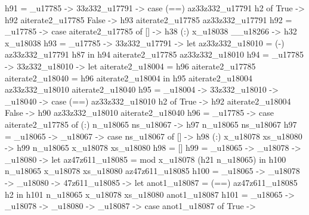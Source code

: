          h91 = _u17785 -> \az33z332_u17791 -> case (==) az33z332_u17791 h2 of
                                                          True -> h92 aiterate2_u17785
                                                          False -> h93 aiterate2_u17785 az33z332_u17791
         h92 = _u17785 -> case aiterate2_u17785 of
                                      [] -> h38
                                      (:) x_u18038 __u18266 -> h32 x_u18038
         h93 = _u17785 -> \az33z332_u17791 -> let
                                                          az33z332_u18010 = (-) az33z332_u17791 h87
                                                        in h94 aiterate2_u17785 az33z332_u18010
         h94 = _u17785 -> \az33z332_u18010 -> let
                                                          aiterate2_u18004 = h96 aiterate2_u17785
                                                          aiterate2_u18040 = h96 aiterate2_u18004
                                                        in h95 aiterate2_u18004 az33z332_u18010 aiterate2_u18040
         h95 = _u18004 -> \az33z332_u18010 -> _u18040 -> case (==) az33z332_u18010 h2 of
                                                                               True -> h92 aiterate2_u18004
                                                                               False ->
                                                                                 h90 az33z332_u18010 aiterate2_u18040
         h96 = _u17785 -> case aiterate2_u17785 of
                                      (:) n_u18065 ns_u18067 -> h97 n_u18065 ns_u18067
         h97 = \n_u18065 -> \ns_u18067 -> case ns_u18067 of
                                            [] -> h98
                                            (:) x_u18078 xs_u18080 -> h99 n_u18065 x_u18078 xs_u18080
         h98 = []
         h99 = \n_u18065 -> \x_u18078 -> \xs_u18080 -> let
                                                         az47z611_u18085 = mod x_u18078 (h21 n_u18065)
                                                       in h100 n_u18065 x_u18078 xs_u18080 az47z611_u18085
         h100 = \n_u18065 -> \x_u18078 -> \xs_u18080 -> \az47z611_u18085 -> let
                                                                              anot1_u18087 = (==) az47z611_u18085 h2
                                                                            in h101 n_u18065 x_u18078 xs_u18080 anot1_u18087
         h101 = \n_u18065 -> \x_u18078 -> \xs_u18080 -> _u18087 -> case anot1_u18087 of
                                                                           True ->
